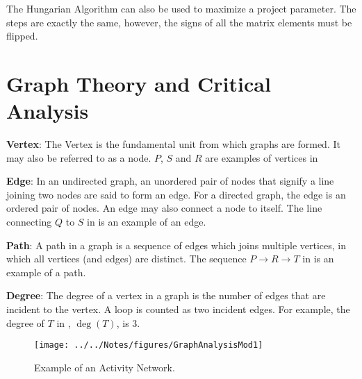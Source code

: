 \begin{note}
	The Hungarian Algorithm can also be used to maximize a project parameter. The steps are exactly the same, however, the signs of all the matrix elements must be flipped.	
\end{note}



\section{Graph Theory and Critical Analysis} \label{Module1:GraphTheoryCriticalAnalysis}

\begin{defn}\label{mod1:defn:Vertex}
   \textbf{Vertex}: The Vertex is the fundamental unit from which graphs are formed. It may also be referred to as a node. $P$, $S$ and $R$ are examples of vertices in 
\end{defn}

\begin{defn}\label{mod1:defn:Edge}
   \textbf{Edge}: In an undirected graph, an unordered pair of nodes that signify  a line joining  two nodes are said to form an edge. For a directed graph, the edge is an ordered pair of nodes. An edge may also connect a node to itself. The line connecting $Q$ to $S$ in  is an example of an edge.
\end{defn}

\begin{defn}\label{mod1:defn:Path}
    \textbf{Path}: A path in a graph is a sequence of edges which joins multiple vertices, in which all vertices (and edges) are distinct. The sequence $P \rightarrow R \rightarrow T$ in  is an example of a path.
\end{defn}

\begin{defn}\label{mod1:defn:Degree}
   \textbf{Degree}: The degree of a vertex  in a graph is the number of edges that are incident to the vertex. A loop is counted as two incident edges. For example, the degree of $T$ in , $\deg(T)$, is 3. 
\end{defn}

\begin{figure}[H]
	\begin{center}
		\texttt{[image: ../../Notes/figures/GraphAnalysisMod1]}
		\caption{\label{mod1:ActNetDiag} Example of an Activity Network.}
	\end{center}
\end{figure}

